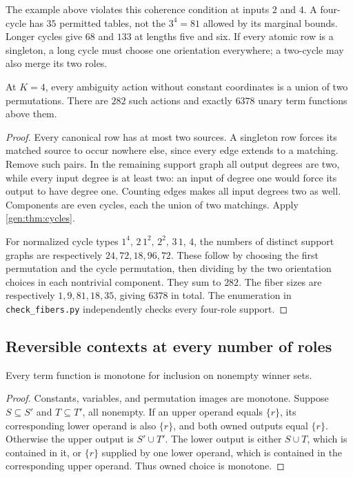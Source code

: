 The example above violates this coherence condition at inputs $2$ and
$4$. A four-cycle has $35$ permitted tables, not the $3^4=81$ allowed
by its marginal bounds. Longer cycles give $68$ and $133$ at lengths
five and six. If every atomic row is a singleton, a long cycle must
choose one orientation everywhere; a two-cycle may also merge its two
roles.

\begin{corollary}
At $K=4$, every ambiguity action without constant coordinates is a union
of two permutations. There are $282$ such actions and exactly $6378$
unary term functions above them.
\end{corollary}
\begin{proof}
Every canonical row has at most two sources. A singleton row forces its
matched source to occur nowhere else, since every edge extends to a
matching. Remove such pairs. In the remaining support graph all output
degrees are two, while every input degree is at least two: an input of
degree one would force its output to have degree one. Counting edges
makes all input degrees two as well. Components are even cycles, each
the union of two matchings. Apply \cref{gen:thm:cycles}.

For normalized cycle types $1^4,\,2\,1^2,\,2^2,\,3\,1,\,4$, the numbers
of distinct support graphs are respectively $24,72,18,96,72$. These
follow by choosing the first permutation and the cycle permutation, then
dividing by the two orientation choices in each nontrivial component.
They sum to $282$. The fiber sizes are respectively $1,9,81,18,35$,
giving $6378$ in total. The enumeration in \texttt{check\_fibers.py}
independently checks every four-role support.
\end{proof}

\subsection{Reversible contexts at every number of roles}

\begin{lemma}
Every term function is monotone for inclusion on nonempty winner sets.
\end{lemma}
\begin{proof}
Constants, variables, and permutation images are monotone. Suppose
$S\subseteq S'$ and $T\subseteq T'$, all nonempty. If an upper operand
equals $\{r\}$, its corresponding lower operand is also $\{r\}$, and
both owned outputs equal $\{r\}$. Otherwise the upper output is
$S'\cup T'$. The lower output is either $S\cup T$, which is contained
in it, or $\{r\}$ supplied by one lower operand, which is contained in
the corresponding upper operand. Thus owned choice is monotone.
\end{proof}

